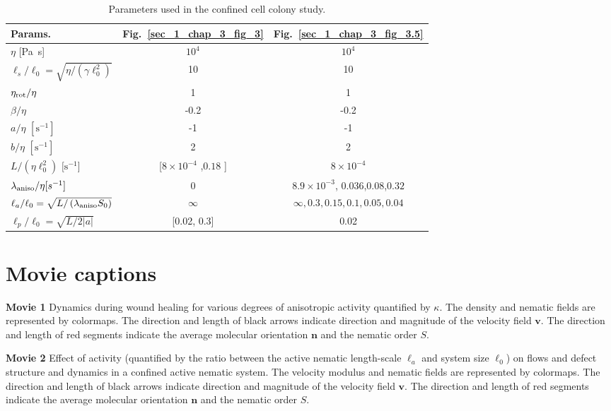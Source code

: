 \documentclass[12pt]{iopart}
\begin{document}
			\begin{table}[H]
				\scriptsize
				\begin{tabular}{l|cc} \textbf{Params.}       &  Fig.~\ref{sec_1_chap_3_fig_3}      &  Fig.~\ref{sec_1_chap_3_fig_3.5}         \\ \hline 
					$\eta$ [\si{\pascal \second}]  & $10^4$ & $10^4$  \\ 
					$\ell_s/\ell_0 = \sqrt{\eta/(\gamma \ell_0^2)}$  &10 &10 \\
					$\eta_{\rm rot} / \eta$ & 1&1\\
					$\beta / \eta$ & -0.2 & -0.2 \\
					$a/\eta$ $[\si{\second}^{-1}]$& -1 &-1 \\
					$b/\eta$ $[\si{\second}^{-1}]$   & 2 &2  \\
					$L/(\eta \ell_0^2)$ $[ \si{\second}^{-1}$] & [$8 \times 10^{-4}$ ,$0.18  $ ] & $8 \times 10^{-4}$  \\
					$\lambda_{\rm aniso}/\eta [s^{-1}]$    & 0 &$8.9 \times 10^{-3}$, $0.036$,$0.08$,$0.32$     \\
					$\ell_a / \ell_0 = \sqrt{L/\left(\lambda_{\rm aniso}S_0\right)}$   & $\infty$  & $\infty, 0.3,0.15,0.1,0.05,0.04$ \\
					$\ell_p / \ell_0 = \sqrt{L/2|a|}$   &  [0.02, 0.3]  & 0.02 \\
					\hline
				\end{tabular}
				\caption{Parameters used in the confined cell colony study.}
				\label{modal_parameters_cell_colony}
			\end{table}
			
			
			\section{Movie captions}
			\qquad 	\textbf{Movie 1} \quad Dynamics during wound healing  for various degrees of anisotropic activity quantified by $\kappa$. The density and nematic fields are represented by colormaps. The direction and length of black arrows indicate direction and magnitude of the velocity field $\bm{v}$. The direction and length of red segments indicate the average molecular orientation $\bm{n}$ and the nematic order $S$.
			
			\textbf{Movie 2} \quad Effect of activity (quantified by the ratio between the active nematic length-scale $\ell_a$ and system size $\ell_0$)  on flows and defect structure and dynamics in a confined active nematic system.  The velocity modulus and nematic fields are represented by colormaps. The direction and length of black arrows indicate direction and magnitude of the velocity field $\bm{v}$. The direction and length of red segments indicate the average molecular orientation $\bm{n}$ and the nematic order $S$.
			
\end{document}
